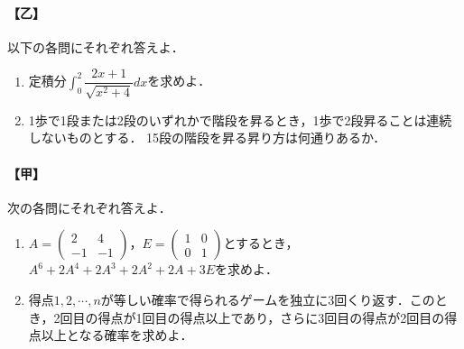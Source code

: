 \documentclass[../../main.tex]{subfiles}
\begin{document}
\paragraph{【乙】}
以下の各問にそれぞれ答えよ．
\begin{enumerate}
  \item 定積分$\displaystyle\int_0^2\dfrac{2x+1}{\sqrt{x^2+4}}dx$を求めよ．
  \item 1歩で1段または2段のいずれかで階段を昇るとき，1歩で2段昇ることは連続しないものとする．
    15段の階段を昇る昇り方は何通りあるか．
\end{enumerate}

\paragraph{【甲】}
次の各問にそれぞれ答えよ．
\begin{enumerate}
  \item $A =
    \begin{pmatrix} 2 & 4 \\ -1 & -1
    \end{pmatrix}$，$E =
    \begin{pmatrix} 1 & 0 \\ 0 & 1
    \end{pmatrix}$とするとき，$A^6 + 2A^4 + 2A^3 + 2A^2 + 2A + 3E$を求めよ．
  \item 得点$1, 2, \cdots, n$が等しい確率で得られるゲームを独立に3回くり返す．このとき，2回目の得点が1回目の得点以上であり，さらに3回目の得点が2回目の得点以上となる確率を求めよ．
\end{enumerate}
\end{document}
